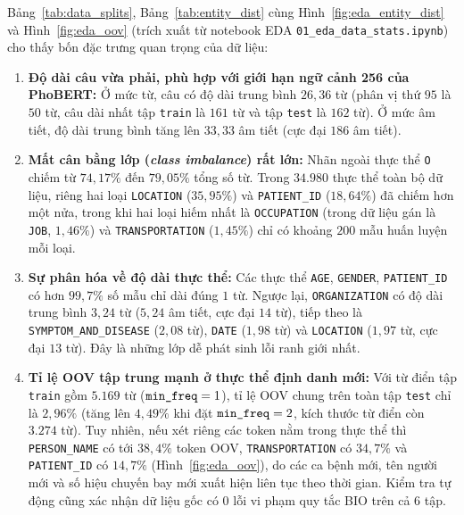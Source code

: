 \documentclass[11pt,a4paper,twocolumn]{article}
\begin{document}
Bảng~\ref{tab:data_splits}, Bảng~\ref{tab:entity_dist} cùng Hình~\ref{fig:eda_entity_dist} và Hình~\ref{fig:eda_oov} (trích xuất từ notebook EDA \texttt{01\_eda\_data\_stats.ipynb}) cho thấy bốn đặc trưng quan trọng của dữ liệu:
\begin{enumerate}
  \item \textbf{Độ dài câu vừa phải, phù hợp với giới hạn ngữ cảnh 256 của PhoBERT:} Ở mức từ, câu có độ dài trung bình $26{,}36$ từ (phân vị thứ $95$ là $50$ từ, câu dài nhất tập \texttt{train} là $161$ từ và tập \texttt{test} là $162$ từ). Ở mức âm tiết, độ dài trung bình tăng lên $33{,}33$ âm tiết (cực đại $186$ âm tiết).
  \item \textbf{Mất cân bằng lớp (\textit{class imbalance}) rất lớn:} Nhãn ngoài thực thể \texttt{O} chiếm từ $74{,}17\%$ đến $79{,}05\%$ tổng số từ. Trong $34.980$ thực thể toàn bộ dữ liệu, riêng hai loại \texttt{LOCATION} ($35{,}95\%$) và \texttt{PATIENT\_ID} ($18{,}64\%$) đã chiếm hơn một nửa, trong khi hai loại hiếm nhất là \texttt{OCCUPATION} (trong dữ liệu gán là \texttt{JOB}, $1{,}46\%$) và \texttt{TRANSPORTATION} ($1{,}45\%$) chỉ có khoảng $200$ mẫu huấn luyện mỗi loại.
  \item \textbf{Sự phân hóa về độ dài thực thể:} Các thực thể \texttt{AGE}, \texttt{GENDER}, \texttt{PATIENT\_ID} có hơn $99{,}7\%$ số mẫu chỉ dài đúng $1$ từ. Ngược lại, \texttt{ORGANIZATION} có độ dài trung bình $3{,}24$ từ ($5{,}24$ âm tiết, cực đại $14$ từ), tiếp theo là \texttt{SYMPTOM\_AND\_DISEASE} ($2{,}08$ từ), \texttt{DATE} ($1{,}98$ từ) và \texttt{LOCATION} ($1{,}97$ từ, cực đại $13$ từ). Đây là những lớp dễ phát sinh lỗi ranh giới nhất.
  \item \textbf{Tỉ lệ OOV tập trung mạnh ở thực thể định danh mới:} Với từ điển tập \texttt{train} gồm $5.169$ từ ($\text{\texttt{min\_freq}}=1$), tỉ lệ OOV chung trên toàn tập \texttt{test} chỉ là $2{,}96\%$ (tăng lên $4{,}49\%$ khi đặt $\text{\texttt{min\_freq}}=2$, kích thước từ điển còn $3.274$ từ). Tuy nhiên, nếu xét riêng các token nằm trong thực thể thì \texttt{PERSON\_NAME} có tới $38{,}4\%$ token OOV, \texttt{TRANSPORTATION} có $34{,}7\%$ và \texttt{PATIENT\_ID} có $14{,}7\%$ (Hình~\ref{fig:eda_oov}), do các ca bệnh mới, tên người mới và số hiệu chuyến bay mới xuất hiện liên tục theo thời gian. Kiểm tra tự động cũng xác nhận dữ liệu gốc có $0$ lỗi vi phạm quy tắc BIO trên cả $6$ tập.
\end{enumerate}
\end{document}
